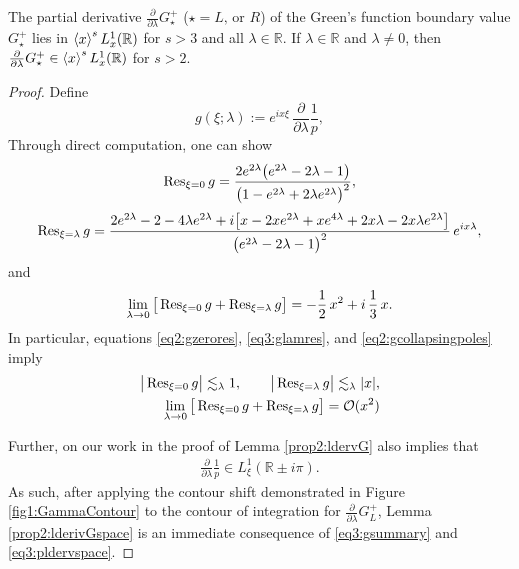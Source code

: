 \documentclass[../dissertation]{subfiles}
\begin{document}
\begin{prop}\label{prop2:lderivGspace}
	The partial derivative $\frac{\partial}{\partial \lambda} G_\star^+$
	($\star = L \text{, or } R$)
	of the Green's function boundary value $G_\star^+$ lies in $\left\langle x \right\rangle^s L_x^1(\mathbb R)$
	for $s> 3$ and all $\lambda \in \mathbb R$. 
	If $\lambda \in \mathbb R$ and $\lambda \ne 0$, then 
	$\frac{\partial}{\partial \lambda} G_\star^+ 
	\in \left\langle x \right\rangle^s L_x^1(\mathbb R)$ for $s > 2$.
\end{prop}
\begin{proof}
	Define
	\[
		g(\xi; \lambda) 
			:= e^{ix\xi}\, \frac{\partial}{\partial \lambda} \frac{1}{p},
	\]
	Through direct computation, one can show 
	\begin{align}\label{eq2:gzerores}
		\operatorname{Res}_{\xi=0} g
			= 
				\frac{
					2 e^{2\lambda}\big(e^{2\lambda}-2\lambda-1\big)
				}{
					\big(
						1 - e^{2\lambda}+ 2\lambda e^{2\lambda}
					\big)^2
				},
	\end{align}
	\begin{align}\label{eq3:glamres}
		\operatorname{Res}_{\xi=\lambda} g
			= 
				\frac{
					2 e^{2\lambda} - 2 - 4 \lambda e^{2\lambda}
					+ i 
					\big[
						x -
						2 x e^{2\lambda} + x e^{4\lambda} + 2x\lambda
						- 2 x \lambda e^{2\lambda}
					\big]
				}
				{\big(e^{2\lambda} - 2 \lambda -1\big)^2}
				\, e^{i x \lambda},
	\end{align}
	and 
	\begin{align}\label{eq2:gcollapsingpoles}
		\lim_{\lambda\to0} 
				\big[
					\operatorname{Res}_{\xi=0} g + \operatorname{Res}_{\xi=\lambda} g
				\big]
			= -\frac{1}{2} \, x^2 + i \, \frac{1}{3} \, x.
	\end{align}
	In particular, equations \eqref{eq2:gzerores}, \eqref{eq3:glamres},
	and \eqref{eq2:gcollapsingpoles} imply
	\begin{align}\label{eq3:gsummary}
		\begin{aligned}
			\big|\operatorname{Res}_{\xi=0} g \big| \lesssim_\lambda 1, \qquad
		\big|\operatorname{Res}_{\xi=\lambda} g \big| \lesssim_\lambda |x|, \\
		\lim_{\lambda\to0} 
				\big[
					\operatorname{Res}_{\xi=0} g + \operatorname{Res}_{\xi=\lambda} g
				\big]
			= \mathcal O(x^2)
		\end{aligned}
	\end{align}

	Further, on our work in the proof of Lemma \ref{prop2:ldervG}
	also implies that
	\begin{align}\label{eq3:pldervspace}
		\frac{\partial}{\partial \lambda} \frac{1}{p}
		 \in L_\xi^1(\mathbb R \pm i \pi).
	\end{align}
	As such, after applying the contour shift demonstrated in Figure
	\ref{fig1:GammaContour} to the contour of integration for
	$\frac{\partial}{\partial \lambda} G_L^+$, 
	Lemma \ref{prop2:lderivGspace} is an immediate 
	consequence of \eqref{eq3:gsummary} and \eqref{eq3:pldervspace}.
\end{proof}
\end{document}
